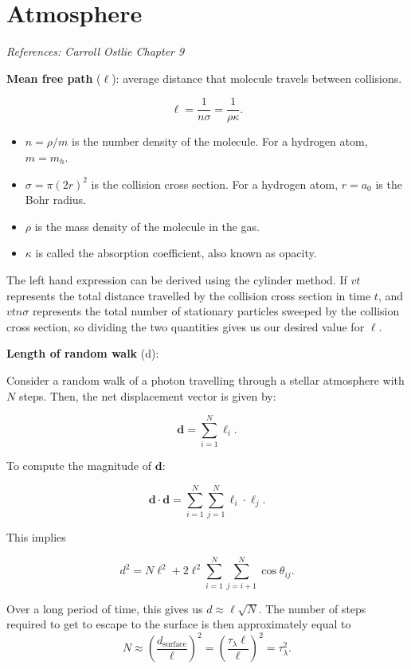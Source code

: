 \documentclass[12pt]{article}
\newcommand{\V}{

\vspace{\baselineskip}

}
\begin{document}
\newpage
\section{Atmosphere}

\textit{References: Carroll Ostlie Chapter 9}\V

\textbf{Mean free path} ($\ell$): average distance that molecule travels between collisions. 

\[\ell = \frac{1}{n\sigma} = \frac{1}{\rho \kappa}.\]

\begin{itemize}
    \item $n = \rho / m$ is the number density of the molecule. For a hydrogen atom, $m = m_h$. 
    \item $\sigma = \pi(2r)^2$ is the collision cross section. For a hydrogen atom, $r = a_0$ is the Bohr radius. 
    \item $\rho$ is the mass density of the molecule in the gas.
    \item $\kappa$ is called the absorption coefficient, also known as opacity. 
\end{itemize}

The left hand expression can be derived using the cylinder method. If $vt$ represents the total distance travelled by the collision cross section in time $t$, and $vtn\sigma$ represents the total number of stationary particles sweeped by the collision cross section, so dividing the two quantities gives us our desired value for $\ell$.\V

\textbf{Length of random walk} (d): 

Consider a random walk of a photon travelling through a stellar atmosphere with $N$ steps. Then, the net displacement vector is given by: 

\[\mathbf{d} = \sum_{i=1}^N \bm{\ell}_i.\]

To compute the magnitude of $\mathbf{d}$:

\[\mathbf{d}\cdot \mathbf{d} = \sum_{i=1}^{N}\sum_{j=1}^N \bm{\ell}_i\cdot \bm{\ell}_j.\]

This implies

\[d^2 = N\ell^2 + 2\ell^2\sum_{i=1}^{N}\sum_{j=i+1}^{N}\cos{\theta_{ij}}.\]

Over a long period of time, this gives us $d\approx \ell \sqrt{N}$. The number of steps required to get to escape to the surface is then approximately equal to \[N \approx \left(\frac{d_{\text{surface}}}{\ell}\right)^2 = \left(\frac{\tau_{\lambda} \ell}{\ell}\right)^2 = \tau_{\lambda}^2. \]
\end{document}
